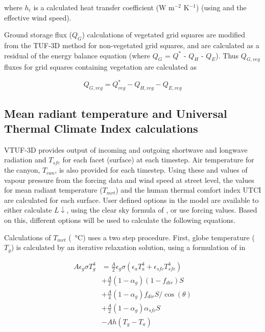 \documentclass[final,3p,times,authoryear]{elsarticle}
\begin{document}
where $h_{i}$ is a calculated heat transfer coefficient (W m$^{-2}$ K$^{-1}$) (using \cite{Mascart1995} and the effective wind speed). 


Ground storage flux ($Q_{G}$) calculations of vegetated grid squares are modified from the TUF-3D method for non-vegetated grid squares, and are calculated as a residual of the energy balance equation (where $Q_{G}$ = $Q^{*}$ - $Q_{H}$ - $Q_{E}$). Thus $Q_{G,veg}$ fluxes for grid squares containing vegetation are calculated as

\begin{equation}\label{eq:qgvtuf}
 Q_{G,veg} =  Q^{*}_{veg} - Q_{H,veg} - Q_{E,veg}
\end{equation}


\subsection{Mean radiant temperature and Universal Thermal Climate Index calculations}\label{sec:tmrtutci}

VTUF-3D provides output of incoming and outgoing shortwave and longwave radiation and $T_{sfc}$ for each facet (surface) at each timestep. Air temperature for the canyon, $T_{can}$, is also provided for each timestep. Using these and values of vapour pressure from the forcing data and wind speed at street level, the values for mean radiant temperature ($T_{mrt}$) and the human thermal comfort index UTCI are calculated for each surface. User defined options in the model are available to either calculate $L\downarrow$, using the clear sky formula of \cite{Prata1996}, or use forcing values. Based on this, different options will be used to calculate the following equations.


Calculations of $T_{mrt}$ (\SI{}{\degreeCelsius}) uses a two step procedure. First, globe temperature ($T_{g}$) is calculated by an iterative relaxation solution, using a formulation of \cite{Liljegren2008} in  

\begin{equation}\label{eq:tg2}
\begin{split}
A\epsilon_{g}\sigma T_{g}^{4} &= \frac{A}{2} \epsilon_{g}\sigma( \epsilon_{a} T_{a}^{4} +  \epsilon_{sfc} T_{sfc}^{4} ) \\
&+ \frac{A}{2}( 1-\alpha_{g})(1-f_{dir})S  \\
&+ \frac{A}{4}( 1-\alpha_{g})f_{dir}S /\cos(\theta) \\
&+ \frac{A}{2}( 1-\alpha_{g})\alpha_{sfc}S \\
&- Ah(T_{g}-T_{a})   
\end{split}
\end{equation}
\end{document}
